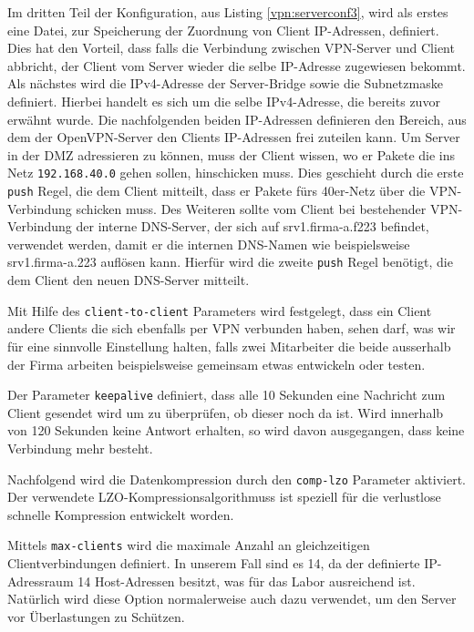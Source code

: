 

Im dritten Teil der Konfiguration, aus Listing \ref{vpn:serverconf3}, wird als erstes eine Datei, zur Speicherung der Zuordnung von Client IP-Adressen, definiert. Dies hat den Vorteil, dass falls die Verbindung zwischen VPN-Server und Client abbricht, der Client vom Server wieder die selbe IP-Adresse zugewiesen bekommt. Als nächstes wird die IPv4-Adresse der Server-Bridge sowie die Subnetzmaske definiert. Hierbei handelt es sich um die selbe IPv4-Adresse, die bereits zuvor erwähnt wurde. Die nachfolgenden beiden IP-Adressen definieren den Bereich, aus dem der OpenVPN-Server den Clients IP-Adressen frei zuteilen kann. Um Server in der DMZ adressieren zu können, muss der Client wissen, wo er Pakete die ins Netz \texttt{192.168.40.0} gehen sollen, hinschicken muss. Dies geschieht durch die erste \texttt{push} Regel, die dem Client mitteilt, dass er Pakete fürs 40er-Netz über die VPN-Verbindung schicken muss.
Des Weiteren sollte vom Client bei bestehender VPN-Verbindung der interne DNS-Server, der sich auf srv1.firma-a.f223 befindet, verwendet werden, damit er die internen DNS-Namen wie beispielsweise srv1.firma-a.223 auflösen kann. Hierfür wird die zweite \texttt{push} Regel benötigt, die dem Client den neuen DNS-Server mitteilt.

Mit Hilfe des \texttt{client-to-client} Parameters wird festgelegt, dass ein Client andere Clients die sich ebenfalls per VPN verbunden haben, sehen darf, was wir für eine sinnvolle Einstellung halten, falls zwei Mitarbeiter die beide ausserhalb der Firma arbeiten beispielsweise gemeinsam etwas entwickeln oder testen.

Der Parameter \texttt{keepalive} definiert, dass alle 10 Sekunden eine Nachricht zum Client gesendet wird um zu überprüfen, ob dieser noch da ist. Wird innerhalb von 120 Sekunden keine Antwort erhalten, so wird davon ausgegangen, dass keine Verbindung mehr besteht.

Nachfolgend wird die Datenkompression durch den \texttt{comp-lzo} Parameter aktiviert. Der verwendete LZO-Kompressionsalgorithmuss ist speziell für die verlustlose schnelle Kompression entwickelt worden.

Mittels \texttt{max-clients} wird die maximale Anzahl an gleichzeitigen Clientverbindungen definiert. In unserem Fall sind es 14, da der definierte IP-Adressraum 14 Host-Adressen besitzt, was für das Labor ausreichend ist. Natürlich wird diese Option normalerweise auch dazu verwendet, um den Server vor Überlastungen zu Schützen.

